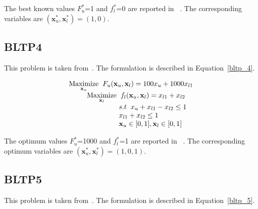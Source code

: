 The best known values $F_u^*$=1 and  $f_l^*$=0 are reported in ~\cite{Angelobilevel}. The corresponding variables are $(\mathbf{x}^*_u, \mathbf{x}^*_l)=(1,0).$

\subsection{BLTP4}

This problem is taken from~\cite{oduguwa2002bi}. The formulation is described in Equation~\ref{bltp_4}. 

\begin{equation}
\begin{array}{lr}
\underset{\mathbf{x}_u}{\text{Maximize}}\hspace{2mm} F_u(\mathbf{x}_u, \mathbf{ x}_l)=100x_u+1000x_{l1}\\


\hspace{9mm} \underset{\mathbf{x}_l} {\text{Maximize}}\hspace{2mm} f_l(\mathbf{x}_u, \mathbf{ x}_l)=x_{l1}+x_{l2} \\

\hspace{25mm}s.t\hspace{2mm} x_u+x_{l1}-x_{l2}\leq 1\\
\hspace{25mm}  x_{l1}+x_{l2} \leq 1\\
\hspace{25mm} \mathbf{x}_u \in {[0,1]},\mathbf{x}_l \in {[0,1]} \\
\end{array}
\label{bltp_4}
\end{equation}

The optimum values $F_u^*$=1000 and  $f_l^*$=1 are reported in ~\cite{Angelobilevel}. The corresponding optimum variables are $(\mathbf{x}^*_u, \mathbf{x}^*_l)=(1,0,1).$


\subsection{BLTP5}

This problem is taken from~\cite{savard1994steepest}. The formulation is described in Equation~\ref{bltp_5}. 

